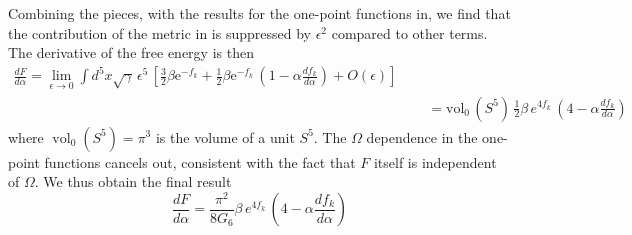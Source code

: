 \documentclass{article}
\begin{document}
Combining the pieces, with the results for the one-point functions in, we find that the contribution of the metric in is suppressed by \(\epsilon^{2}\) compared to other terms. The derivative of the free energy is then
\[
\begin{array}{l}
\frac{d F}{d \alpha}=\lim _{\epsilon \rightarrow 0} \int d^{5}
x \sqrt{\gamma} \, \epsilon^{5} \, \left[ \frac{3}{2} \beta
\mathrm{e}^{-f_{k}} + \frac{1}{2} \beta
\mathrm{e}^{-f_{k}} \, \left(1-\alpha \frac{d f_{k}}{d \alpha}\right)
+ O(\epsilon) \right] \\
\quad \quad \quad \quad \quad \quad \quad \quad \quad \quad \quad
\quad \quad \quad \quad \quad \quad \quad \quad \quad \; \quad \quad \quad \quad \quad \quad \quad \quad \quad \; = \mathrm{vol}_{0} \, \left( S^{5}\right) \, \frac{1}{2} \beta
\, e^{4 f_{k}} \, \left(4-\alpha \frac{d f_{k}}{d \alpha}\right)
\end{array}
\]
where \(\operatorname{vol}_{0}\left(S^{5}\right)=\pi^{3}\) is the volume of a unit \(S^{5}\). The \(\Omega\) dependence in the one-point functions cancels out, consistent with the fact that \(F\) itself is independent of \(\Omega\). We thus obtain the final result
\[
\frac{d F}{d \alpha}=\frac{\pi^{2}}{8 G_{6}} \beta \, e^{4 f_{k}} \, \left(4-\alpha \frac{df_{k}}{d \alpha}\right)
\]
\end{document}
